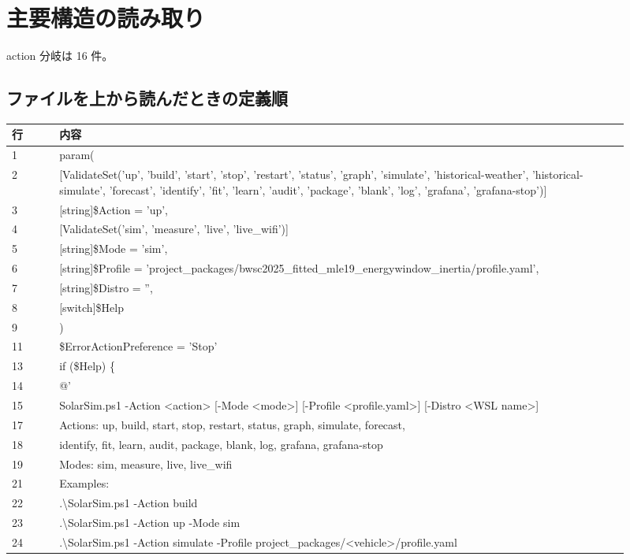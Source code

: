 \documentclass[a4paper,11pt]{article}
\begin{document}
        \section*{主要構造の読み取り}
        action 分岐は 16 件。



        \subsection*{ファイルを上から読んだときの定義順}
            \begin{longtable}{p{0.07\linewidth} p{0.84\linewidth}}
            \toprule
            行 & 内容 \\
            \midrule
            1 & param( \\
2 & [ValidateSet('up', 'build', 'start', 'stop', 'restart', 'status', 'graph', 'simulate', 'historical-weather', 'historical-simulate', 'forecast', 'identify', 'fit', 'learn', 'audit', 'package', 'blank', 'log', 'grafana', 'grafana-stop')] \\
3 & [string]\$Action = 'up', \\
4 & [ValidateSet('sim', 'measure', 'live', 'live\_wifi')] \\
5 & [string]\$Mode = 'sim', \\
6 & [string]\$Profile = 'project\_packages/bwsc2025\_fitted\_mle19\_energywindow\_inertia/profile.yaml', \\
7 & [string]\$Distro = '', \\
8 & [switch]\$Help \\
9 & ) \\
11 & \$ErrorActionPreference = 'Stop' \\
13 & if (\$Help) \{ \\
14 & @' \\
15 & SolarSim.ps1 -Action <action> [-Mode <mode>] [-Profile <profile.yaml>] [-Distro <WSL name>] \\
17 & Actions: up, build, start, stop, restart, status, graph, simulate, forecast, \\
18 & identify, fit, learn, audit, package, blank, log, grafana, grafana-stop \\
19 & Modes:   sim, measure, live, live\_wifi \\
21 & Examples: \\
22 & .\textbackslash{}SolarSim.ps1 -Action build \\
23 & .\textbackslash{}SolarSim.ps1 -Action up -Mode sim \\
24 & .\textbackslash{}SolarSim.ps1 -Action simulate -Profile project\_packages/<vehicle>/profile.yaml \\

\end{longtable}
\end{document}
